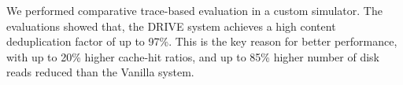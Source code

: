 We performed comparative trace-based evaluation in a custom simulator. The evaluations
showed that, the DRIVE system achieves a high content deduplication factor of up to 97\%. This
is the key reason for better performance, with up to 20\% higher cache-hit ratios, and up to 85\%
higher number of disk reads reduced than the Vanilla system.





